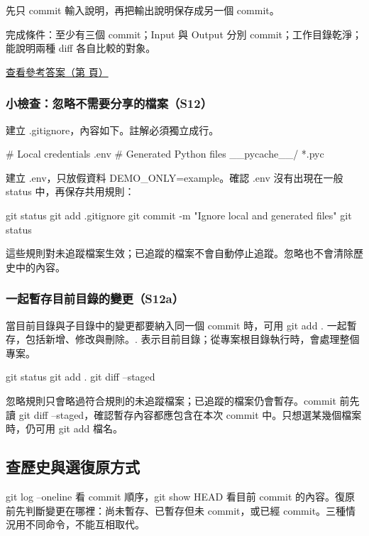 \documentclass[11pt,a4paper]{article}
\DeclareRobustCommand{\code}[1]{{\small\ttfamily #1}}
\newcommand{\AnswerLink}[1]{%
    \par\noindent\hyperref[#1]{\textcolor{handoutaccent}{查看參考答案（第 \pageref*{#1} 頁）}}\par}
\begin{document}
先只 commit 輸入說明，再把輸出說明保存成另一個 commit。

完成條件：至少有三個 commit；Input 與 Output 分別 commit；工作目錄乾淨；能說明兩種 \code{diff} 各自比較的對象。

\AnswerLink{answer:staging}

\subsubsection{小檢查：忽略不需要分享的檔案（S12）}

建立 \code{.gitignore}，內容如下。註解必須獨立成行。

\begin{Code}
# Local credentials
.env
# Generated Python files
__pycache__/
*.pyc
\end{Code}

建立 \code{.env}，只放假資料 \code{DEMO\_ONLY=example}。確認 \code{.env} 沒有出現在一般 \code{status} 中，再保存共用規則：

\begin{Code}
git status
git add .gitignore
git commit -m "Ignore local and generated files"
git status
\end{Code}

這些規則對未追蹤檔案生效；已追蹤的檔案不會自動停止追蹤。忽略也不會清除歷史中的內容。

\subsubsection{一起暫存目前目錄的變更（S12a）}

當目前目錄與子目錄中的變更都要納入同一個 commit 時，可用 \code{git add .} 一起暫存，包括新增、修改與刪除。\code{.} 表示目前目錄；從專案根目錄執行時，會處理整個專案。

\begin{Code}
git status
git add .
git diff --staged
\end{Code}

忽略規則只會略過符合規則的未追蹤檔案；已追蹤的檔案仍會暫存。commit 前先讀 \code{git diff --staged}，確認暫存內容都應包含在本次 commit 中。只想選某幾個檔案時，仍可用 \code{git add 檔名}。

\subsection{查歷史與選復原方式}

\code{git log --oneline} 看 commit 順序，\code{git show HEAD} 看目前 commit 的內容。復原前先判斷變更在哪裡：尚未暫存、已暫存但未 commit，或已經 commit。三種情況用不同命令，不能互相取代。
\end{document}
